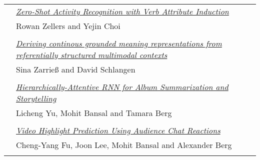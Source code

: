 \begin{tabular}{p{20mm}p{128mm}}
 & \hyperlink{page.955}{\em Zero-Shot Activity Recognition with Verb Attribute Induction}\\
         & Rowan Zellers and Yejin Choi \\
\\

 & \hyperlink{page.968}{\em Deriving continous grounded meaning representations from referentially structured multimodal contexts}\\
         & Sina Zarrie{\ss} and David Schlangen \\
\\

 & \hyperlink{page.975}{\em Hierarchically-Attentive RNN for Album Summarization and Storytelling}\\
         & Licheng Yu, Mohit Bansal and Tamara Berg \\
\\

 & \hyperlink{page.981}{\em Video Highlight Prediction Using Audience Chat Reactions}\\
         & Cheng-Yang Fu, Joon Lee, Mohit Bansal and Alexander Berg \\
\\

\end{tabular}
\newpage
